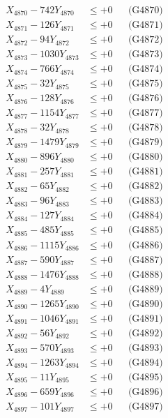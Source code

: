 \documentclass[a4paper,10pt]{article}
\begin{document}
{\begin{align}
X_{4870} - 742Y_{4870} &\leq +0 && \text{(G4870)} \\
\allowbreak
X_{4871} - 126Y_{4871} &\leq +0 && \text{(G4871)} \\
X_{4872} - 94Y_{4872} &\leq +0 && \text{(G4872)} \\
X_{4873} - 1030Y_{4873} &\leq +0 && \text{(G4873)} \\
X_{4874} - 766Y_{4874} &\leq +0 && \text{(G4874)} \\
X_{4875} - 32Y_{4875} &\leq +0 && \text{(G4875)} \\
X_{4876} - 128Y_{4876} &\leq +0 && \text{(G4876)} \\
X_{4877} - 1154Y_{4877} &\leq +0 && \text{(G4877)} \\
X_{4878} - 32Y_{4878} &\leq +0 && \text{(G4878)} \\
X_{4879} - 1479Y_{4879} &\leq +0 && \text{(G4879)} \\
X_{4880} - 896Y_{4880} &\leq +0 && \text{(G4880)} \\
\allowbreak
X_{4881} - 257Y_{4881} &\leq +0 && \text{(G4881)} \\
X_{4882} - 65Y_{4882} &\leq +0 && \text{(G4882)} \\
X_{4883} - 96Y_{4883} &\leq +0 && \text{(G4883)} \\
X_{4884} - 127Y_{4884} &\leq +0 && \text{(G4884)} \\
X_{4885} - 485Y_{4885} &\leq +0 && \text{(G4885)} \\
X_{4886} - 1115Y_{4886} &\leq +0 && \text{(G4886)} \\
X_{4887} - 590Y_{4887} &\leq +0 && \text{(G4887)} \\
X_{4888} - 1476Y_{4888} &\leq +0 && \text{(G4888)} \\
X_{4889} - 4Y_{4889} &\leq +0 && \text{(G4889)} \\
X_{4890} - 1265Y_{4890} &\leq +0 && \text{(G4890)} \\
\allowbreak
X_{4891} - 1046Y_{4891} &\leq +0 && \text{(G4891)} \\
X_{4892} - 56Y_{4892} &\leq +0 && \text{(G4892)} \\
X_{4893} - 570Y_{4893} &\leq +0 && \text{(G4893)} \\
X_{4894} - 1263Y_{4894} &\leq +0 && \text{(G4894)} \\
X_{4895} - 11Y_{4895} &\leq +0 && \text{(G4895)} \\
X_{4896} - 659Y_{4896} &\leq +0 && \text{(G4896)} \\
X_{4897} - 101Y_{4897} &\leq +0 && \text{(G4897)} \\

\end{align}}
\end{document}

